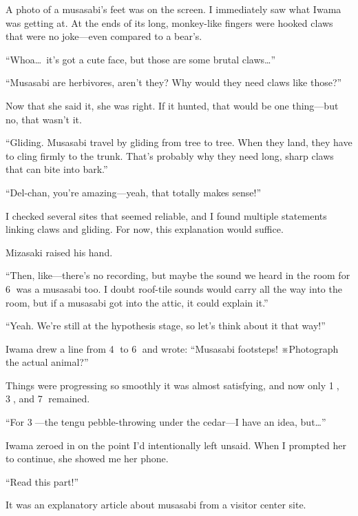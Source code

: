 \documentclass[
    a4paper,
    12pt,
    twoside,
    openany,
    UTF8,
    fontset=windows
]{ctexbook}
\begin{document}
A photo of a musasabi's feet was on the screen. I immediately saw what Iwama was getting at. At the ends of its long, monkey-like fingers were hooked claws that were no joke---even compared to a bear's.

``Whoa\dots\ it's got a cute face, but those are some brutal claws\dots''

``Musasabi are herbivores, aren't they? Why would they need claws like those?''

Now that she said it, she was right. If it hunted, that would be one thing---but no, that wasn't it.

``Gliding. Musasabi travel by gliding from tree to tree. When they land, they have to cling firmly to the trunk. That's probably why they need long, sharp claws that can bite into bark.''

``Del-chan, you're amazing---yeah, that totally makes sense!''

I checked several sites that seemed reliable, and I found multiple statements linking claws and gliding. For now, this explanation would suffice.

Mizasaki raised his hand.

``Then, like---there's no recording, but maybe the sound we heard in the room for \textcircled{6} was a musasabi too. I doubt roof-tile sounds would carry all the way into the room, but if a musasabi got into the attic, it could explain it.''

``Yeah. We're still at the hypothesis stage, so let's think about it that way!''

Iwama drew a line from \textcircled{4} to \textcircled{6} and wrote: ``Musasabi footsteps! ※Photograph the actual animal?''

Things were progressing so smoothly it was almost satisfying, and now only \textcircled{1}, \textcircled{3}, and \textcircled{7} remained.

``For \textcircled{3}---the tengu pebble-throwing under the cedar---I have an idea, but\dots''

Iwama zeroed in on the point I'd intentionally left unsaid. When I prompted her to continue, she showed me her phone.

``Read this part!''

It was an explanatory article about musasabi from a visitor center site.
\end{document}
